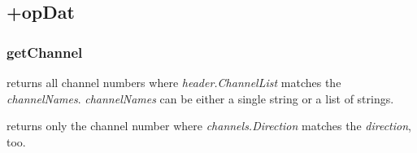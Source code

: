 \subsection{+opDat}
\subsubsection{getChannel}
\bdf
{} returns all channel numbers where \emph{header.ChannelList} matches the \emph{channelNames}. \emph{channelNames} can be either a single string or a list of strings.

 returns only the channel number where \emph{channels.Direction} matches the \emph{direction}, too.
\edf